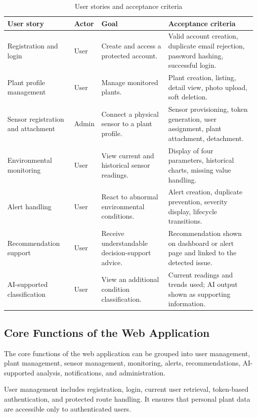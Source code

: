 \begin{table}[H]
\centering
\caption{User stories and acceptance criteria}
\label{tab:user-stories-acceptance-criteria}
\begin{tabular}{p{}p{}p{}p{}}
\hline
\textbf{User story} & \textbf{Actor} & \textbf{Goal} & \textbf{Acceptance criteria} \\
\hline
Registration and login & User & Create and access a protected account. & Valid account creation, duplicate email rejection, password hashing, successful login. \\
Plant profile management & User & Manage monitored plants. & Plant creation, listing, detail view, photo upload, soft deletion. \\
Sensor registration and attachment & Admin & Connect a physical sensor to a plant profile. & Sensor provisioning, token generation, user assignment, plant attachment, detachment. \\
Environmental monitoring & User & View current and historical sensor readings. & Display of four parameters, historical charts, missing value handling. \\
Alert handling & User & React to abnormal environmental conditions. & Alert creation, duplicate prevention, severity display, lifecycle transitions. \\
Recommendation support & User & Receive understandable decision-support advice. & Recommendation shown on dashboard or alert page and linked to the detected issue. \\
AI-supported classification & User & View an additional condition classification. & Current readings and trends used; AI output shown as supporting information. \\
\hline
\end{tabular}
\end{table}

\subsection{Core Functions of the Web Application}
\label{subsec:core-functions-web-application}

The core functions of the web application can be grouped into user management, plant management, sensor management, monitoring, alerts, recommendations, AI-supported analysis, notifications, and administration.

User management includes registration, login, current user retrieval, token-based authentication, and protected route handling. It ensures that personal plant data are accessible only to authenticated users.

